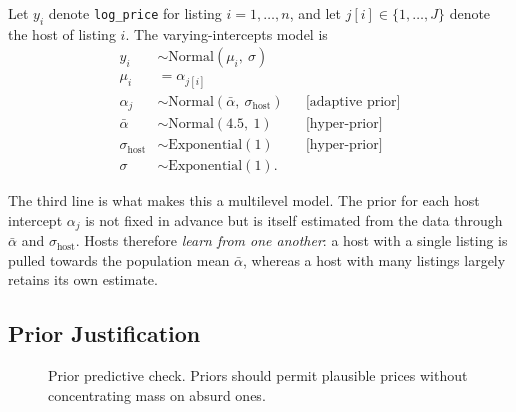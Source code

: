 \documentclass[11pt,a4paper]{article}
\begin{document}
Let $y_i$ denote \texttt{log\_price} for listing $i = 1,\dots,n$, and let
$j[i] \in \{1,\dots,J\}$ denote the host of listing $i$. The varying-intercepts
model is
\begin{align}
  y_i          &\sim \mathrm{Normal}(\mu_i,\ \sigma) \\
  \mu_i        &= \alpha_{j[i]} \\
  \alpha_j     &\sim \mathrm{Normal}(\bar{\alpha},\ \sigma_{\text{host}})
                  &&\text{[adaptive prior]} \\
  \bar{\alpha} &\sim \mathrm{Normal}(4.5,\ 1) &&\text{[hyper-prior]} \\
  \sigma_{\text{host}} &\sim \mathrm{Exponential}(1) &&\text{[hyper-prior]} \\
  \sigma       &\sim \mathrm{Exponential}(1).
\end{align}

The third line is what makes this a multilevel model. The prior for each host
intercept $\alpha_j$ is not fixed in advance but is itself estimated from the
data through $\bar{\alpha}$ and $\sigma_{\text{host}}$. Hosts therefore
\emph{learn from one another}: a host with a single listing is pulled towards the
population mean $\bar{\alpha}$, whereas a host with many listings largely retains
its own estimate.

\subsection{Prior Justification}

\begin{figure}[htbp]
\centering
\caption{Prior predictive check. Priors should permit plausible prices without
concentrating mass on absurd ones.}
\label{fig:prior-pred}
\end{figure}
\end{document}
